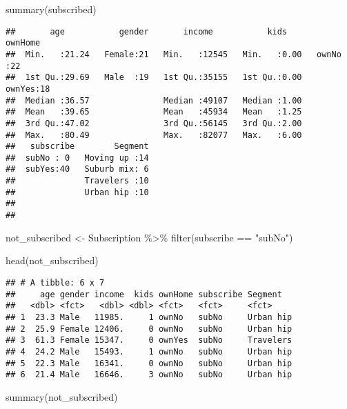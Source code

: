 \documentclass[
]{article}
\newenvironment{Shaded}{\begin{snugshade}}{\end{snugshade}}
\newcommand{\FunctionTok}[1]{\textcolor[rgb]{0.00,0.00,0.00}{#1}}
\newcommand{\NormalTok}[1]{#1}
\newcommand{\OtherTok}[1]{\textcolor[rgb]{0.56,0.35,0.01}{#1}}
\newcommand{\SpecialCharTok}[1]{\textcolor[rgb]{0.00,0.00,0.00}{#1}}
\newcommand{\StringTok}[1]{\textcolor[rgb]{0.31,0.60,0.02}{#1}}
\begin{document}
\begin{Shaded}
\begin{Highlighting}[]
\FunctionTok{summary}\NormalTok{(subscribed)}
\end{Highlighting}
\end{Shaded}

\begin{verbatim}
##       age           gender       income           kids        ownHome  
##  Min.   :21.24   Female:21   Min.   :12545   Min.   :0.00   ownNo :22  
##  1st Qu.:29.69   Male  :19   1st Qu.:35155   1st Qu.:0.00   ownYes:18  
##  Median :36.57               Median :49107   Median :1.00              
##  Mean   :39.65               Mean   :45934   Mean   :1.25              
##  3rd Qu.:47.02               3rd Qu.:56145   3rd Qu.:2.00              
##  Max.   :80.49               Max.   :82077   Max.   :6.00              
##   subscribe        Segment  
##  subNo : 0   Moving up :14  
##  subYes:40   Suburb mix: 6  
##              Travelers :10  
##              Urban hip :10  
##                             
## 
\end{verbatim}

\begin{Shaded}
\begin{Highlighting}[]
\NormalTok{not\_subscribed }\OtherTok{\textless{}{-}}\NormalTok{ Subscription }\SpecialCharTok{\%\textgreater{}\%}
  \FunctionTok{filter}\NormalTok{(subscribe }\SpecialCharTok{==} \StringTok{"subNo"}\NormalTok{)}

\FunctionTok{head}\NormalTok{(not\_subscribed)}
\end{Highlighting}
\end{Shaded}

\begin{verbatim}
## # A tibble: 6 x 7
##     age gender income  kids ownHome subscribe Segment  
##   <dbl> <fct>   <dbl> <dbl> <fct>   <fct>     <fct>    
## 1  23.3 Male   11985.     1 ownNo   subNo     Urban hip
## 2  25.9 Female 12406.     0 ownNo   subNo     Urban hip
## 3  61.3 Female 15347.     0 ownYes  subNo     Travelers
## 4  24.2 Male   15493.     1 ownNo   subNo     Urban hip
## 5  22.3 Male   16341.     0 ownNo   subNo     Urban hip
## 6  21.4 Male   16646.     3 ownNo   subNo     Urban hip
\end{verbatim}

\begin{Shaded}
\begin{Highlighting}[]
\FunctionTok{summary}\NormalTok{(not\_subscribed)}
\end{Highlighting}
\end{Shaded}
\end{document}
